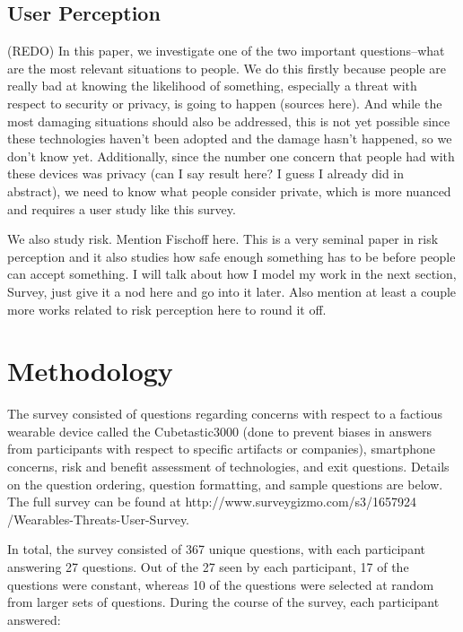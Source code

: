 \documentclass{acm_proc_article-sp}
\begin{document}
\subsection{User Perception}
(REDO) In this paper, we investigate one of the two important questions--what are the most relevant situations to people. We do this firstly because people are really bad at knowing the likelihood of something, especially a threat with respect to security or privacy, is going to happen (sources here). And while the most damaging situations should also be addressed, this is not yet possible since these technologies haven't been adopted and the damage hasn't happened, so we don't know yet. Additionally, since the number one concern that people had with these devices was privacy (can I say result here? I guess I already did in abstract), we need to know what people consider private, which is more nuanced and requires a user study like this survey. 

We also study risk. Mention Fischoff here. This is a very seminal paper in risk perception and it also studies how safe enough something has to be before people can accept something. I will talk about how I model my work in the next section, Survey, just give it a nod here and go into it later. Also mention at least a couple more works related to risk perception here to round it off. 


\section{Methodology}
The survey consisted of questions regarding concerns with respect to a factious wearable device called the Cubetastic3000 (done to prevent biases in answers from participants with respect to specific artifacts or companies), smartphone concerns, risk and benefit assessment of technologies, and exit questions. Details on the question ordering, question formatting, and sample questions are below. The full survey can be found at http://www.surveygizmo.com/s3/1657924 /Wearables-Threats-User-Survey. 

In total, the survey consisted of 367 unique questions, with each participant answering 27 questions. Out of the 27 seen by each participant, 17 of the questions were constant, whereas 10 of the questions were selected at random from larger sets of questions. During the course of the survey, each participant answered:   \\[-.8cm]
\end{document}
